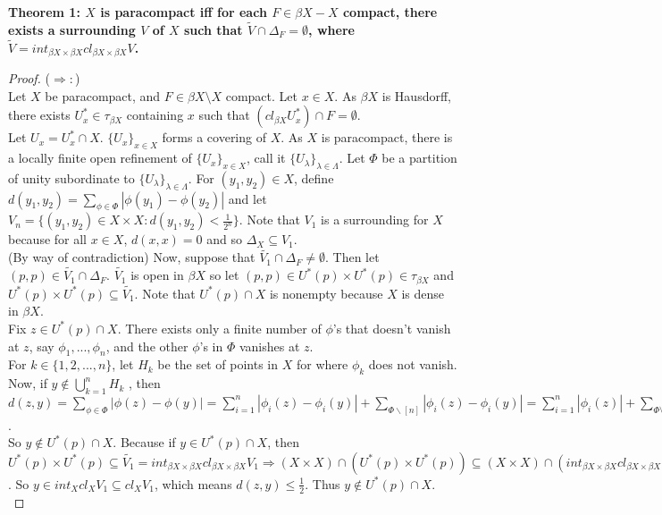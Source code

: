 \documentclass{amsart}
\author{shaun yi cheng}
\begin{document}
\bf{Theorem 1:} 
$X$ is paracompact iff for each $F \in \beta X-X$ compact, there exists a surrounding $V$ of $X$ such that $\tilde{V} \cap \Delta_F=\emptyset$, where
 $\tilde{V}=int_{\beta X \times \beta X} cl_{\beta X \times \beta X} V$.



\begin{proof}
($\Rightarrow :$)\\
Let $X$ be paracompact, and $F\in \beta X\setminus X$ compact. Let $x\in X.$ As $\beta X$ is Hausdorff, there exists $U^*_x \in \tau_{\beta X}$ containing $x$ such that 
$(cl_{\beta X}U^*_x)\cap F = \emptyset$. \\
Let $U_x = U^*_x\cap X$. $\{U_x\}_{x\in X}$ forms a covering of $X$. As $X$ is paracompact, there is a locally finite open refinement of $\{U_x\}_{x\in X}$, call it $\{U_\lambda\}_{\lambda \in \Lambda}$. Let $\Phi$ be a partition of unity subordinate to $\{U_\lambda\}_{\lambda \in \Lambda}$. For $(y_1,y_2) \in X$, define $d(y_1,y_2)=\sum_{\phi\in\Phi} |\phi(y_1)-\phi(y_2)| $ and let $V_n=\{(y_1,y_2)\in X \times X : d(y_1,y_2) < \frac{1}{2^n} \}$. Note that $V_1$ is a surrounding for $X$ because for all $x\in X$, $d(x,x)=0$ and so $\Delta_X \subseteq V_1$. \\
(By way of contradiction) Now, suppose that $\tilde{V_1}\cap \Delta_F \neq \emptyset$. Then let $(p,p)\in \tilde{V_1}\cap\Delta_F.$
$\tilde{V_1}$ is open in $\beta X$ so let $(p,p) \in U^*(p) \times U^*(p) \in \tau_{\beta X}$ and $U^*(p) \times U^*(p) \subseteq \tilde{V_1}.$ Note that $U^*(p)\cap X$ is nonempty because $X$ is dense in $\beta X$.\\
Fix $z\in U^*(p) \cap X.$ There exists only a finite number of $\phi$'s that doesn't vanish at $z$, say $\phi_1,...,\phi_n$, and the other $\phi$'s in $\Phi$ vanishes at $z$. \\
For $k\in \{1,2,...,n\}$, let $H_k$ be the set of points in $X$ for where $\phi_k$ does not vanish. Now, if $y\notin \bigcup_{k=1}^{n} H_k$ , then $d(z,y)=\sum_{\phi \in \Phi}|\phi(z)-\phi(y)| = \sum_{i=1}^{n} |\phi_i(z)-\phi_i(y)| + \sum_{\Phi\backslash [n]} |\phi_i(z)-\phi_i(y)| = \sum_{i=1}^{n}|\phi_i(z)|+\sum_{\Phi \setminus \{ \phi_i: 1\leq i \leq n\}} |\phi_i(y)| = 2$. \\
So $y\notin U^*(p)\cap X$. Because if $y \in U^*(p) \cap X$, then $U^*(p) \times U^*(p) \subseteq  \tilde{V_1}=int_{\beta X \times \beta X} cl_{\beta X \times \beta X} V_1 \Rightarrow (X\times X)\cap(U^*(p)\times U^*(p))\subseteq (X \times X)\cap (int_{\beta X \times \beta X} cl_{\beta X \times \beta X} V_1)$. So $y\in int_X cl_X V_1 \subseteq cl_X V_1$, which means $d(z,y)\leq \frac{1}{2}.$ Thus $y\notin U^*(p)\cap X$.\\


\end{proof}
\end{document}
